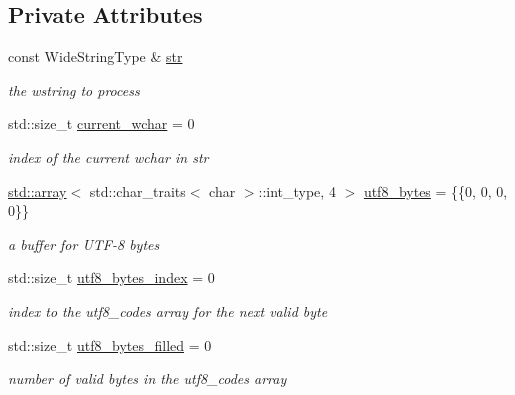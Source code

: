 \subsection*{Private Attributes}
\begin{DoxyCompactItemize}
\item 
const Wide\+String\+Type \& \mbox{\hyperlink{classnlohmann_1_1detail_1_1wide__string__input__adapter_a30fcb522f072d58eb0fb52cfb784e9c9}{str}}
\begin{DoxyCompactList}\small\item\em the wstring to process \end{DoxyCompactList}\item 
std\+::size\+\_\+t \mbox{\hyperlink{classnlohmann_1_1detail_1_1wide__string__input__adapter_a196fe1fb07310dc8c2ca3a0a9ef9b27a}{current\+\_\+wchar}} = 0
\begin{DoxyCompactList}\small\item\em index of the current wchar in str \end{DoxyCompactList}\item 
\mbox{\hyperlink{namespacenlohmann_1_1detail_a1ed8fc6239da25abcaf681d30ace4985af1f713c9e000f5d3f280adbd124df4f5}{std\+::array}}$<$ std\+::char\+\_\+traits$<$ char $>$\+::int\+\_\+type, 4 $>$ \mbox{\hyperlink{classnlohmann_1_1detail_1_1wide__string__input__adapter_af0854ae66725357d074912379a235128}{utf8\+\_\+bytes}} = \{\{0, 0, 0, 0\}\}
\begin{DoxyCompactList}\small\item\em a buffer for U\+T\+F-\/8 bytes \end{DoxyCompactList}\item 
std\+::size\+\_\+t \mbox{\hyperlink{classnlohmann_1_1detail_1_1wide__string__input__adapter_a6d87bc3e8b427e06cda936383283e0c4}{utf8\+\_\+bytes\+\_\+index}} = 0
\begin{DoxyCompactList}\small\item\em index to the utf8\+\_\+codes array for the next valid byte \end{DoxyCompactList}\item 
std\+::size\+\_\+t \mbox{\hyperlink{classnlohmann_1_1detail_1_1wide__string__input__adapter_a9fc33bf0974526336e53ea530c7097ff}{utf8\+\_\+bytes\+\_\+filled}} = 0
\begin{DoxyCompactList}\small\item\em number of valid bytes in the utf8\+\_\+codes array \end{DoxyCompactList}\end{DoxyCompactItemize}


